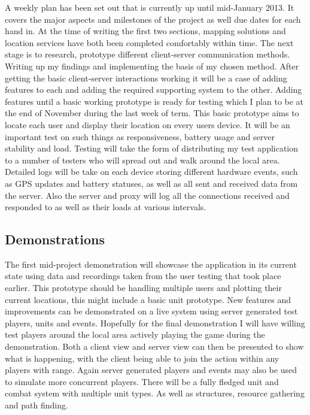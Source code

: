 \documentclass[11pt,fleqn,twoside]{article}
\begin{document}
A weekly plan has been set out that is currently up until mid-January 2013. It covers the major aspects and milestones of the project as well due dates for each hand in. At the time of writing the first two sections, mapping solutions and location services have both been completed comfortably within time. The next stage is to research, prototype different client-server communication methods. Writing up my findings and implementing the basis of my chosen method. After getting the basic client-server interactions working it will be a case of adding features to each and adding the required supporting system to the other. Adding features until a basic working prototype is ready for testing which I plan to be at the end of November during the last week of term. This basic prototype aims to locate each user and display their location on every users device. It will be an important test on such things as responsiveness, battery usage and server stability and load. Testing will take the form of distributing my test application to a number of testers who will spread out and walk around the local area. Detailed logs will be take on each device storing different hardware events, such as GPS updates and battery statuses, as well as all sent and received data from the server. Also the server and proxy will log all the connections received and responded to as well as their loads at various intervals.

\subsection{Demonstrations}
The first mid-project demonstration will showcase the application in its current state using data and recordings taken from the user testing that took place earlier. This prototype should be handling multiple users and plotting their current locations, this might include a basic unit prototype. New features and improvements can be demonstrated on a live system using server generated test players, units and events. Hopefully for the final demonstration I will have willing test players around the local area actively playing the game during the demonstration. Both a client view and server view can then be presented to show what is happening, with the client being able to join the action within any players with range. Again server generated players and events may also be used to simulate more concurrent players. There will be a fully fledged unit and combat system with multiple unit types. As well as structures, resource gathering and path finding.
\end{document}
